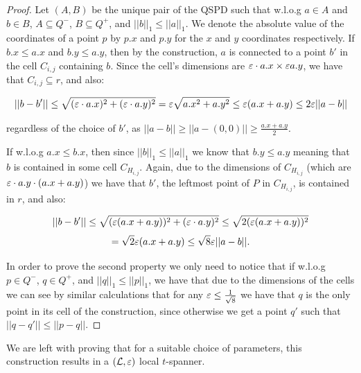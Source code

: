 \documentclass[12pt]{article}%
\begin{document}
\begin{proof}
    Let $(A,B)$ be the unique pair of the QSPD such that w.l.o.g
    $a\in A$ and $b\in B$, $A\subseteq Q^-$, $B\subseteq Q^+$, and
    $||b||_{1} \leq ||a||_{1}$. We denote the absolute value of the
    coordinates of a point $p$ by $p.x$ and $p.y$ for the $x$ and $y$
    coordinates respectively. If $b.x \leq a.x$ and $b.y \leq a.y$,
    then by the construction, $a$ is connected to a point $b'$ in the
    cell $C_{i,j}$ containing $b$. Since the cell's dimensions are
    $\varepsilon\cdot a.x \times \varepsilon a.y$, we have that
    $C_{i,j}\subseteq r$, and also:
	
	\begin{equation}
            ||b-b'||\leq \sqrt{(\varepsilon\cdot a.x)^2+(\varepsilon\cdot
               a.y)^2}=\varepsilon\sqrt{a.x^2+a.y^2}\leq \varepsilon(a.x+a.y) \leq
            2\varepsilon||a-b||
        \end{equation}
	
	regardless of the choice of $b'$, as
        $||a-b||\geq||a-(0,0)||\geq \frac{a.x+a.y}{2}$.
	
	If w.l.o.g $a.x\leq b.x$, then since $||b||_{1} \leq
        ||a||_{1}$ we know that $b.y \leq a.y$ meaning that $b$ is
        contained in some cell $C_{H_{i,j}}$. Again, due to the
        dimensions of $C_{H_{i,j}}$ (which are
        $\eps\cdot a.y \time \eps\cdot(a.x+a.y)$) we have that $b'$,
        the leftmost point of $P$ in $C_{H_{i,j}}$, is contained in
        $r$, and also:
	
	\begin{equation}
            ||b-b'||\leq \sqrt{(\varepsilon (a.x+a.y))^2+(\varepsilon\cdot
               a.y)^2}\leq \sqrt{2(\varepsilon (a.x+a.y))^2}
        \end{equation}
	\begin{equation}
            =\sqrt{2}\varepsilon(a.x+a.y) \leq \sqrt{8}\varepsilon||a-b||.
        \end{equation}
	
	In order to prove the second property we only need to notice
        that if w.l.o.g $p\in Q^-$, $q\in Q^+$, and
        $||q||_1\leq ||p||_1$, we have that due to the dimensions of
        the cells we can see by similar calculations that for any
        $\varepsilon\leq \frac{1}{\sqrt{8}}$ we have that $q$ is the only
        point in its cell of the construction, since otherwise we get
        a point $q'$ such that $||q-q'||\leq ||p-q||$.
	
    \end{proof}

    We are left with proving that for a suitable choice of parameters,
    this construction results in a $(\mathcal{L},\varepsilon)$ local $t$-spanner.
\end{document}
